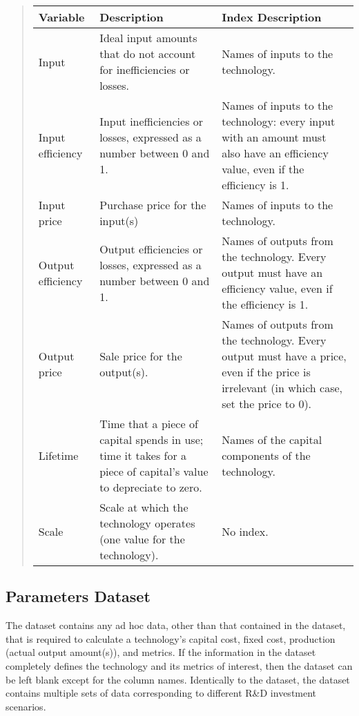 \documentclass[letterpaper,10pt,english]{sphinxmanual}
\begin{document}
\begin{quote}


\begin{savenotes}\sphinxattablestart
\centering
\begin{tabulary}{\linewidth}[t]{|T|T|T|}
\hline
\sphinxstyletheadfamily 
Variable
&\sphinxstyletheadfamily 
Description
&\sphinxstyletheadfamily 
Index Description
\\
\hline
Input
&
Ideal input amounts that do not account for inefficiencies or losses.
&
Names of inputs to the technology.
\\
\hline
Input efficiency
&
Input inefficiencies or losses, expressed as a number between 0 and 1.
&
Names of inputs to the technology: every input with an amount must also have an efficiency value, even if the efficiency is 1.
\\
\hline
Input price
&
Purchase price for the input(s)
&
Names of inputs to the technology.
\\
\hline
Output efficiency
&
Output efficiencies or losses, expressed as a number between 0 and 1.
&
Names of outputs from the technology. Every output must have an efficiency value, even if the efficiency is 1.
\\
\hline
Output price
&
Sale price for the output(s).
&
Names of outputs from the technology. Every output must have a price, even if the price is irrelevant (in which case, set the price to 0).
\\
\hline
Lifetime
&
Time that a piece of capital spends in use; time it takes for a piece of capital’s value to depreciate to zero.
&
Names of the capital components of the technology.
\\
\hline
Scale
&
Scale at which the technology operates (one value for the technology).
&
No index.
\\
\hline
\end{tabulary}
\par
\sphinxattableend\end{savenotes}
\end{quote}


\subsection{Parameters Dataset}
\label{\detokenize{cheat-sheet:parameters-dataset}}
The  dataset contains any ad hoc data, other than that contained in the  dataset, that is required to calculate a technology’s capital cost, fixed cost, production (actual output amount(s)), and metrics. If the information in the  dataset completely defines the technology and its metrics of interest, then the  dataset can be left blank except for the column names. Identically to the  dataset, the  dataset contains multiple sets of data corresponding to different R\&D investment scenarios.
\end{document}
